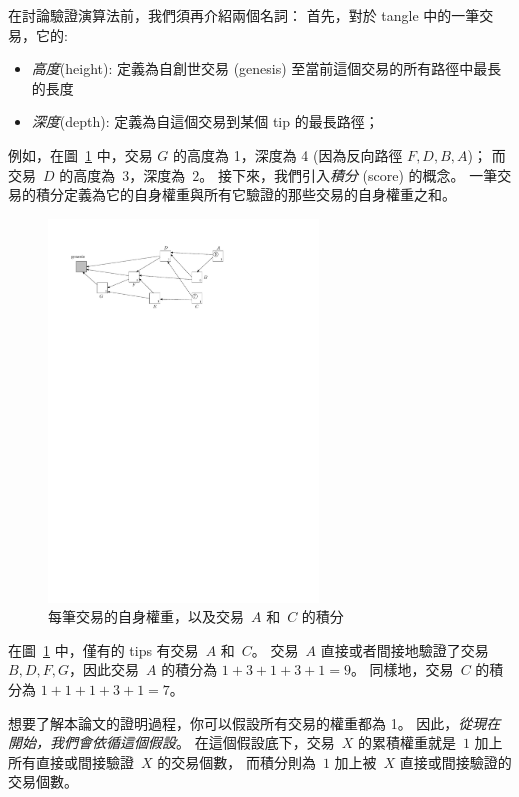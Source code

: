 \documentclass[12pt]{article}
\begin{document}
\begin{CJK}{UTF8}{bkai}
在討論驗證演算法前，我們須再介紹兩個名詞：
首先，對於 tangle 中的一筆交易，它的:
\begin{itemize}
 \item \emph{高度}(height): 定義為自創世交易 (genesis) 至當前這個交易的所有路徑中最長的長度
 \item \emph{深度}(depth): 定義為自這個交易到某個 tip 的最長路徑；
\end{itemize}

例如，在圖~\ref{f_reverse_weights} 中，交易 $G$ 的高度為 1，深度為 4 (因為反向路徑 $F,D,B,A$)；
而交易~$D$ 的高度為~$3$，深度為~$2$。
接下來，我們引入\emph{積分} (score) 的概念。
一筆交易的積分定義為它的自身權重與所有它驗證的那些交易的自身權重之和。

\begin{figure}
 \centering \includegraphics[width=0.64\textwidth]{reverse_weights} 
\caption{
每筆交易的自身權重，以及交易~$A$ 和~$C$ 的積分}
\label{f_reverse_weights}
\end{figure}

在圖~\ref{f_reverse_weights} 中，僅有的 tips 有交易~$A$ 和~$C$。
交易~$A$ 直接或者間接地驗證了交易 $B,D,F,G$，因此交易~$A$ 的積分為 $1+3+1+3+1 = 9$。
同樣地，交易~$C$ 的積分為 $1+1+1+3+1 = 7$。

想要了解本論文的證明過程，你可以假設所有交易的權重都為 1。
因此，\emph{從現在開始，我們會依循這個假設}。
在這個假設底下，交易~$X$ 的累積權重就是~$1$ 加上所有直接或間接驗證~$X$ 的交易個數，
而積分則為~$1$ 加上被~$X$ 直接或間接驗證的交易個數。


\end{CJK}
\end{document}
